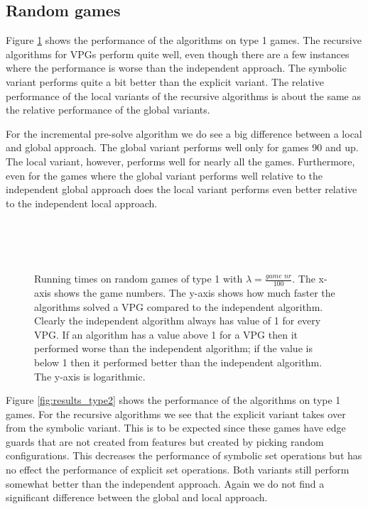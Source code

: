 \subsection{Random games}
Figure \ref{fig:results_type1} shows the performance of the algorithms on type 1 games. The recursive algorithms for VPGs perform quite well, even though there are a few instances where the performance is worse than the independent approach. The symbolic variant performs quite a bit better than the explicit variant. The relative performance of the local variants of the recursive algorithms is about the same as the relative performance of the global variants. 

For the incremental pre-solve algorithm we do see a big difference between a local and global approach. The global variant performs well only for games 90 and up. The local variant, however, performs well for nearly all the games. Furthermore, even for the games where the global variant performs well relative to the independent global approach does the local variant performs even better relative to the independent local approach.
\begin{figure}[H]
	\centering
	\begin{multicols}{2}
		\\
		\\
		\\
		
	\end{multicols}
	\caption{Running times on random games of type 1 with $\lambda = \frac{\textit{game nr}}{100}$. The x-axis shows the game numbers. The y-axis shows how much faster the algorithms solved a VPG compared to the independent algorithm. Clearly the independent algorithm always has value of 1 for every VPG. If an algorithm has a value above 1 for a VPG then it performed worse than the independent algorithm; if the value is below 1 then it performed better than the independent algorithm. The y-axis is logarithmic.}
	\label{fig:results_type1}
\end{figure}%


Figure \ref{fig:results_type2} shows the performance of the algorithms on type 1 games. For the recursive algorithms we see that the explicit variant takes over from the symbolic variant. This is to be expected since these games have edge guards that are not created from features but created by picking random configurations. This decreases the performance of symbolic set operations but has no effect the performance of explicit set operations. Both variants still perform somewhat better than the independent approach. Again we do not find a significant difference between the global and local approach.


